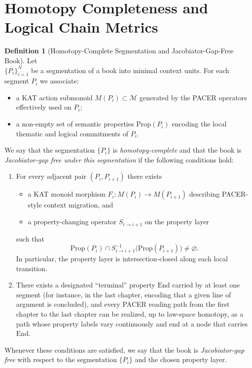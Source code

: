 \documentclass[11pt]{book}
\theoremstyle{plain}
\theoremstyle{definition}
\newtheorem{definition}[theorem]{Definition}
\theoremstyle{remark}
\begin{document}
\section{Homotopy Completeness and Logical Chain Metrics}


\begin{definition}[Homotopy-Complete Segmentation and Jacobiator-Gap-Free Book]
\label{def:homotopy-complete-book}
Let \\$\{P_i\}_{i=1}^N$ be a segmentation of a book into minimal context units.
For each segment $P_i$ we associate:
\begin{itemize}
  \item a KAT action submonoid $M(P_i) \subset \mathcal{M}$ generated by the
        PACER operators effectively used on $P_i$;
  \item a non-empty set of semantic properties $\mathrm{Prop}(P_i)$ encoding
        the local thematic and logical commitments of $P_i$.
\end{itemize}
We say that the segmentation $\{P_i\}$ is \emph{homotopy-complete} and that
the book is \emph{Jacobiator-gap free under this segmentation} if the
following conditions hold:
\begin{enumerate}
  \item For every adjacent pair $(P_i,P_{i+1})$ there exists
        \begin{itemize}
          \item a KAT monoid morphism
                $F_i : M(P_i) \to M(P_{i+1})$ describing PACER-style
                context migration, and
          \item a property-changing operator $S_{i \to i+1}$ on the property
                layer
        \end{itemize}
        such that
        \[
          \mathrm{Prop}(P_i)
          \cap S_{i \to i+1}^{-1}\bigl(\mathrm{Prop}(P_{i+1})\bigr)
          \neq \varnothing.
        \]
        In particular, the property layer is intersection-closed along each
        local transition.
  \item There exists a designated ``terminal'' property
        $\mathrm{End}$ carried by at least one segment (for instance, in the
        last chapter, encoding that a given line of argument is concluded),
        and every PACER reading path from the first chapter to the last
        chapter can be realized, up to law-space homotopy, as a path whose
        property labels vary continuously and end at a node that carries
        $\mathrm{End}$.
\end{enumerate}
Whenever these conditions are satisfied, we say that the book is
\emph{Jacobiator-gap free} with respect to the segmentation
$\{P_i\}$ and the chosen property layer.
\end{definition}
\end{document}
